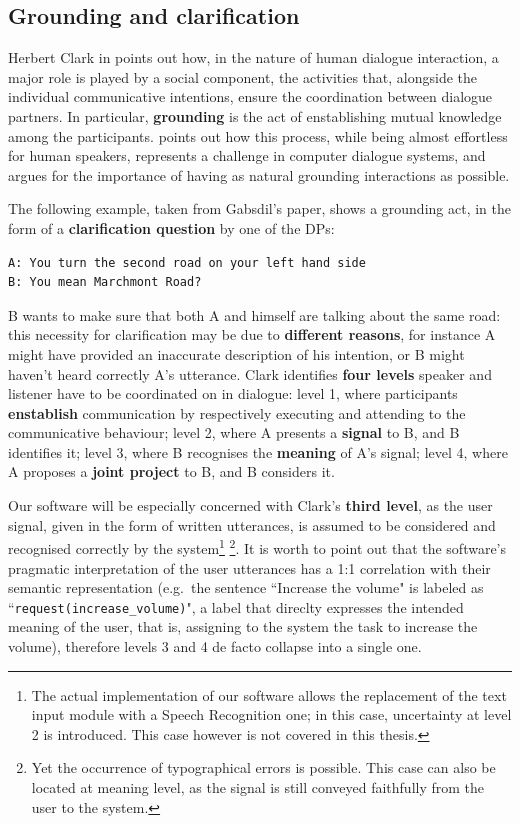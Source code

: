\subsection{Grounding and clarification}\label{ch:rw:ds:grounding}
Herbert Clark in \cite{clark_1996} points out how, in the nature of human dialogue interaction, a major role is played by a social component, the activities that, alongside the individual communicative intentions, ensure the coordination between dialogue partners. In particular, \textbf{grounding} is the act of enstablishing mutual knowledge among the participants. \cite{Gabsdil03clarificationin} points out how this process, while being almost effortless for human speakers, represents a challenge in computer dialogue systems, and argues for the importance of having as natural grounding interactions as possible.

The following example, taken from Gabsdil's paper, shows a grounding act, in the form of a \textbf{clarification question} by one of the DPs:
\begin{verbatim}
A: You turn the second road on your left hand side
B: You mean Marchmont Road?
\end{verbatim}
B wants to make sure that both A and himself are talking about the same road: this necessity for clarification may be due to \textbf{different reasons}, for instance A might have provided an inaccurate description of his intention, or B might haven't heard correctly A's utterance. Clark identifies \textbf{four levels} speaker and listener have to be coordinated on in dialogue: level 1, where participants \textbf{enstablish} communication by respectively executing and attending to the communicative behaviour; level 2, where A presents a \textbf{signal} to B, and B identifies it; level 3, where B recognises the \textbf{meaning} of A's signal; level 4, where A proposes a \textbf{joint project} to B, and B considers it.

Our software will be especially concerned with Clark's \textbf{third level}, as the user signal, given in the form of written utterances, is assumed to be considered and recognised correctly by the system\footnote{The actual implementation of our software allows the replacement of the text input module with a Speech Recognition one; in this case, uncertainty at level 2 is introduced. This case however is not covered in this thesis.} \footnote{Yet the occurrence of typographical errors is possible. This case can also be located at meaning level, as the signal is still conveyed faithfully from the user to the system.}. It is worth to point out that the software's pragmatic interpretation of the user utterances has a 1:1 correlation with their semantic representation (e.g.\ the sentence ``Increase the volume" is labeled as ``\texttt{request(increase\_volume)}", a label that direclty expresses the intended meaning of the user, that is, assigning to the system the task to increase the volume), therefore levels 3 and 4 de facto collapse into a single one.


